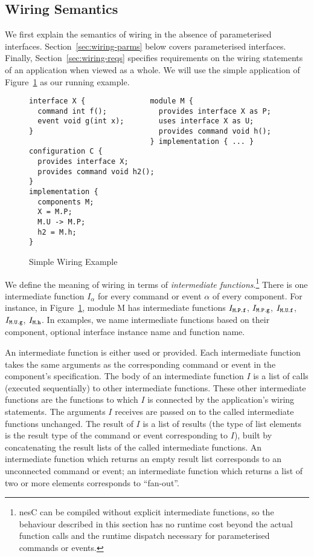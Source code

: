 \documentclass[11pt]{article}
\newcommand{\code}[1]{{\tt #1}}
\newcommand{\nesc}{nesC\xspace}
\begin{document}
\subsection{Wiring Semantics}
\label{sec:wiring-semantics}

We first explain the semantics of wiring in the absence of parameterised
interfaces. Section~\ref{sec:wiring-parms} below covers parameterised
interfaces. Finally, Section~\ref{sec:wiring-reqs} specifies requirements
on the wiring statements of an application when viewed as a whole. We will
use the simple application of Figure~\ref{fig:wiring} as our running
example.

\begin{figure}
\begin{verbatim}
interface X {               module M {
  command int f();            provides interface X as P;
  event void g(int x);        uses interface X as U;
}                             provides command void h();
                            } implementation { ... }
configuration C {
  provides interface X;
  provides command void h2();
}
implementation {
  components M;
  X = M.P;
  M.U -> M.P;
  h2 = M.h;
}  
\end{verbatim}
\caption{Simple Wiring Example}
\label{fig:wiring}
\end{figure}

We define the meaning of wiring in terms of \emph{intermediate
functions}.\footnote{\nesc can be compiled without explicit intermediate
functions, so the behaviour described in this section has no runtime cost
beyond the actual function calls and the runtime dispatch necessary for
parameterised commands or events.}  There is one intermediate function
$I_\alpha$ for every command or event $\alpha$ of every component. For
instance, in Figure~\ref{fig:wiring}, module M has intermediate functions
$I_\code{M.P.f}$, $I_\code{M.P.g}$, $I_\code{M.U.f}$, $I_\code{M.U.g}$,
$I_\code{M.h}$.  In examples, we name intermediate functions based on their
component, optional interface instance name and function name.

An intermediate function is either used or provided. Each intermediate
function takes the same arguments as the corresponding command or event in
the component's specification. The body of an intermediate function $I$ is
a list of calls (executed sequentially) to other intermediate
functions. These other intermediate functions are the functions to which
$I$ is connected by the application's wiring statements. The arguments $I$
receives are passed on to the called intermediate functions unchanged. The
result of $I$ is a list of results (the type of list elements is the result
type of the command or event corresponding to $I$), built by concatenating
the result lists of the called intermediate functions. An intermediate
function which returns an empty result list corresponds to an unconnected
command or event; an intermediate function which returns a list of two or
more elements corresponds to ``fan-out''.
\end{document}
